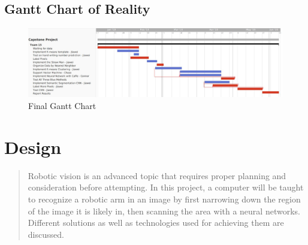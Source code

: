 \documentclass[10pt,journal,compsoc, draftclsnofoot,onecolumn]{IEEEtran}
\begin{document}
\subsection{Gantt Chart of Reality}
\begin{figure}[H]
  \begin{center}
    \includegraphics[width=1.\textwidth]{update_chart.JPG}
  \end{center}
  \caption{Final Gantt Chart}
\end{figure}


\newpage
\section{Design}

\begin{abstract}
Robotic vision is an advanced topic that requires proper planning and consideration before attempting. In this project, a computer will be taught to recognize a robotic arm in an image by first narrowing down the region of the image it is likely in, then scanning the area with a neural networks. Different solutions as well as technologies used for achieving them are discussed.
\end{abstract}
\end{document}
